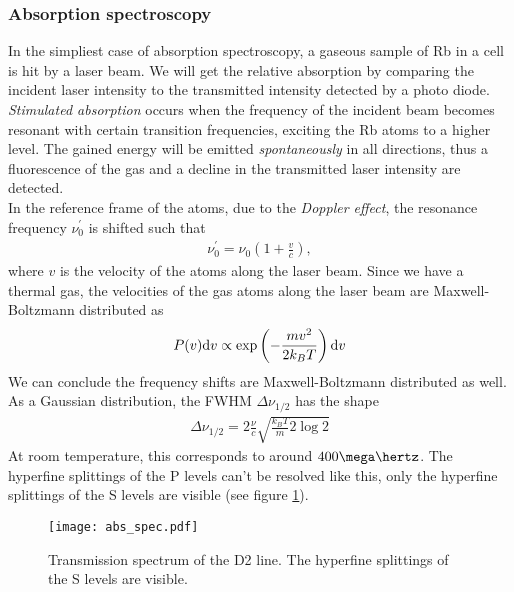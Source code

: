 \subsubsection{Absorption spectroscopy}
In the simpliest case of absorption spectroscopy, a gaseous sample of Rb in a cell is hit by a laser beam. We will get the relative absorption by comparing the incident laser intensity to the transmitted intensity detected by a photo diode. \emph{Stimulated absorption} occurs when the frequency of the incident beam becomes resonant with certain transition frequencies, exciting the Rb atoms to a higher level. The gained energy will be emitted \emph{spontaneously} in all directions, thus a fluorescence of the gas and a decline in the transmitted laser intensity are detected.\\
In the reference frame of the atoms, due to the \emph{Doppler effect}, the resonance frequency $\nu_0^\prime$ is shifted such that
\begin{align}
\nu_0^\prime=\nu_0\left(1+\frac{v}{c}\right),
\end{align}
where $v$ is the velocity of the atoms along the laser beam.
Since we have a thermal gas, the velocities of the gas atoms along the laser beam are Maxwell-Boltzmann distributed as
\begin{align}
P(v)\mathrm{d} v\propto \exp\left(-\frac{mv^2}{2k_B T}\right)\mathrm{d} v
\end{align}
We can conclude the frequency shifts are Maxwell-Boltzmann distributed as well. As a Gaussian distribution, the FWHM $\Delta\nu_{1/2}$ has the shape
\begin{align}
\Delta\nu_{1/2}=2\frac{\nu}{c}\sqrt{\frac{k_B T}{m}2\log 2}
\end{align}
At room temperature, this corresponds to around $4                                                                                                                                                                                                                                                                                                               00\mega\hertz$. The hyperfine splittings of the P levels can't be resolved like this, only the hyperfine splittings of the S levels are visible (see figure \ref{fig:abs_spec}).
\begin{figure}[h]
	\centering
	\texttt{[image: abs\_spec.pdf]}
	\caption[Transmission spectrum of the D2 line]{Transmission spectrum of the D2 line. The hyperfine splittings of the S levels are visible. \cite{lit:AK_manual2012}}
	\label{fig:abs_spec}
\end{figure}

